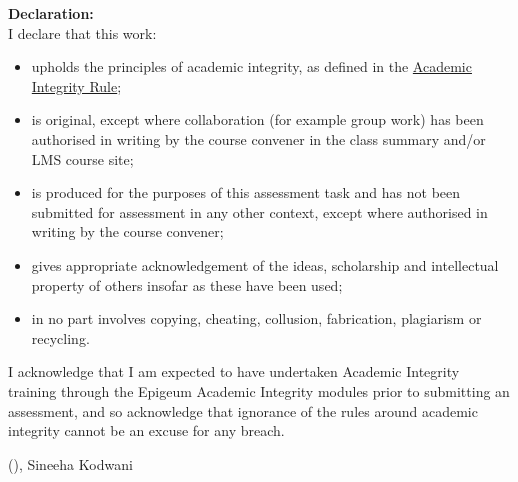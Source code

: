 {\sffamily\bfseries\Large Declaration:}\\

I declare that this work:
\begin{itemize}
  \item upholds the principles of academic integrity, as defined in the \href{https://www.legislation.gov.au/Details/F2021L00997}{Academic Integrity Rule};
  \item is original, except where collaboration (for example group work) has been authorised in writing by the course convener in the class summary and/or LMS course site;
  \item is produced for the purposes of this assessment task and has not been submitted for assessment in any other context, except where authorised in writing by the course convener;
  \item gives appropriate acknowledgement of the ideas, scholarship and intellectual property of others insofar as these have been used;
  \item in no part involves copying, cheating, collusion, fabrication, plagiarism or recycling.
\end{itemize}

I acknowledge that I am expected to have undertaken Academic Integrity training through the Epigeum Academic Integrity modules prior to submitting an assessment, and so acknowledge that ignorance of the rules around academic integrity cannot be an excuse for any breach.




\vspace{1 cm}
\hfill \monthname{} (\the\year), Sineeha Kodwani
\newpage




